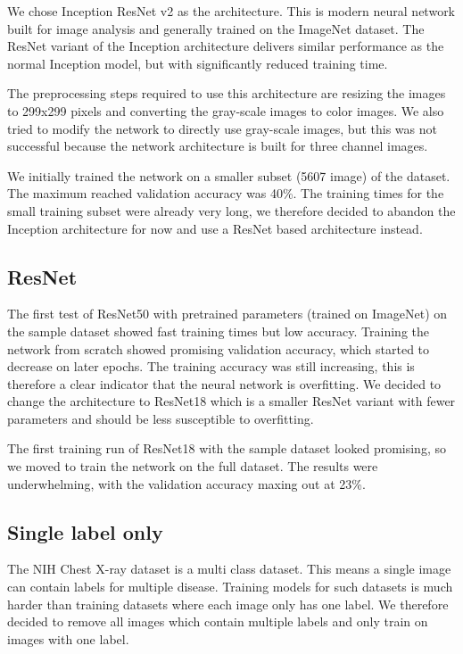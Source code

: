 We chose Inception ResNet v2 \cite{szegedy2017inception} as the architecture. This is modern neural network built for image analysis and generally trained on the ImageNet dataset.
The ResNet variant of the Inception architecture delivers similar performance as the normal Inception model, but with significantly reduced training time.

The preprocessing steps required to use this architecture are resizing the images to 299x299 pixels and converting the gray-scale images to color images.
We also tried to modify the network to directly use gray-scale images, but this was not successful because the network architecture is built for three channel images.

We initially trained the network on a smaller subset (5607 image) of the dataset. The maximum reached validation accuracy was 40\%. The training times for the small training subset
were already very long, we therefore decided to abandon the Inception architecture for now and use a ResNet based architecture instead.

\subsection{ResNet}

The first test of ResNet50 \cite{he2016deep} with pretrained parameters (trained on ImageNet) on the sample dataset showed fast training times but low accuracy. Training the network from scratch showed promising validation accuracy, which started to decrease on later epochs. The training accuracy was still increasing, this is therefore a clear indicator that the neural network is overfitting. We decided to change the architecture to ResNet18 which is a smaller ResNet variant with fewer parameters and should be less susceptible to overfitting.

The first training run of ResNet18 with the sample dataset looked promising, so we moved to train the network on the full dataset. The results were underwhelming, with the validation accuracy maxing out at 23\%.

\subsection{Single label only}
The NIH Chest X-ray dataset is a multi class dataset. This means a single image can contain labels for multiple disease. Training models for such datasets is much harder than training datasets where each image only has one label. We therefore decided to remove all images which contain multiple labels and only train on images with one label.

